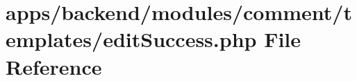 \hypertarget{backend_2modules_2comment_2templates_2edit_success_8php}{\section{apps/backend/modules/comment/templates/edit\-Success.php File Reference}
\label{backend_2modules_2comment_2templates_2edit_success_8php}
}
